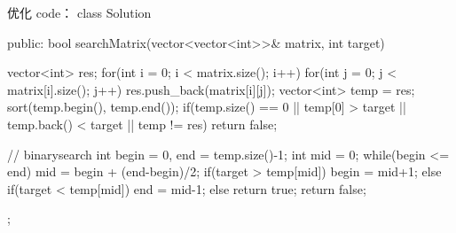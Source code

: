 优化 code：
class Solution {
public:
    bool searchMatrix(vector<vector<int>>& matrix, int target) {
        vector<int> res;
        for(int i = 0; i < matrix.size(); i++)
        {
            for(int j = 0; j < matrix[i].size(); j++)
            {
                res.push_back(matrix[i][j]);
            }
        }
        vector<int> temp = res;
        sort(temp.begin(), temp.end());
        if(temp.size() == 0 || temp[0] > target || temp.back() < target || temp != res) return false;
        
        // binarysearch
        int begin = 0, end = temp.size()-1;
        int mid = 0;
        while(begin <= end)
        {
            mid = begin + (end-begin)/2;
            if(target > temp[mid]) begin = mid+1;
            else if(target < temp[mid]) end = mid-1;
            else return true;
        }
        return false;
    }
};